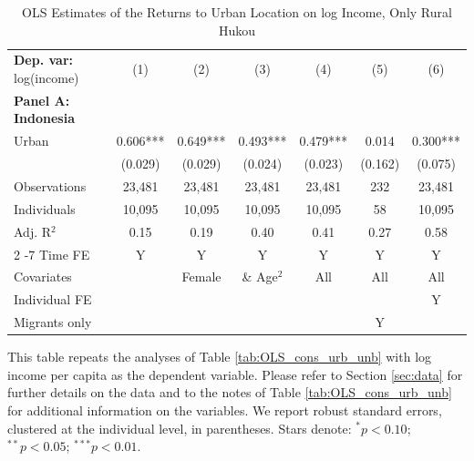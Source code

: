 \begin{table}[htbp] \centering \begin{threeparttable}
 \caption{OLS Estimates of the Returns to Urban Location on log Income, Only Rural Hukou} 
 \label{tab:OLS_CHN_hukou_rural_only_income_urban_unb} 
\begin{tabular}{l cccccc} \toprule  \textbf{Dep. var:}  log(income) 
                    &\multicolumn{1}{c}{(1)}   &\multicolumn{1}{c}{(2)}   &\multicolumn{1}{c}{(3)}   &\multicolumn{1}{c}{(4)}   &\multicolumn{1}{c}{(5)}   &\multicolumn{1}{c}{(6)}   \\
\textbf{Panel A: Indonesia} \\
Urban               &       0.606***&       0.649***&       0.493***&       0.479***&       0.014   &       0.300***\\
                    &     (0.029)   &     (0.029)   &     (0.024)   &     (0.023)   &     (0.162)   &     (0.075)   \\
\addlinespace
Observations        &      23,481   &      23,481   &      23,481   &      23,481   &         232   &      23,481   \\
Individuals         &      10,095   &      10,095   &      10,095   &      10,095   &          58   &      10,095   \\
Adj. R$^{2}$        &        0.15   &        0.19   &        0.40   &        0.41   &        0.27   &        0.58   \\
\cmidrule{2 -7} Time FE & Y & Y & Y & Y & Y & Y \\ Covariates & & Female & \& Age$^2$ & All & All & All \\ Individual FE & & & & & & Y \\ Migrants only & & & & & Y & \\ \bottomrule \end{tabular} \begin{tablenotes}[flushleft] \footnotesize \item{This table repeats the analyses of Table \ref{tab:OLS_cons_urb_unb} with log income per capita as the dependent variable. Please refer to Section \ref{sec:data} for further details on the data and to the notes of Table \ref{tab:OLS_cons_urb_unb} for additional information on the variables. We report robust standard errors, clustered at the individual level, in parentheses. Stars denote: $^{*} p<0.10$; $^{**} p<0.05$; $^{***} p<0.01$.} \end{tablenotes} \end{threeparttable} \end{table}
